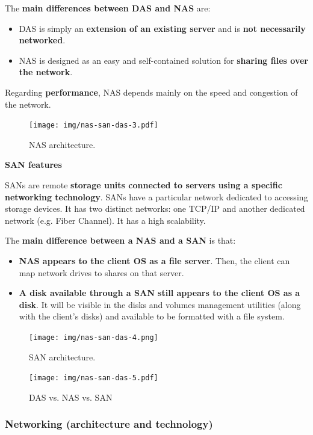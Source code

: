 \highspace
The \textbf{main differences between DAS and NAS} are:
\begin{itemize}
	\item DAS is simply an \textbf{extension of an existing server} and is \textbf{not necessarily networked}.
	\item NAS is designed as an easy and self-contained solution for \textbf{sharing files over the network}.
\end{itemize}
Regarding \textbf{performance}, NAS depends mainly on the speed and congestion of the network.
\begin{figure}[!htp]
	\centering
	\texttt{[image: img/nas-san-das-3.pdf]}
	\caption{NAS architecture.}
\end{figure}

\highspace
\begin{flushleft}
	\textcolor{Red2}{ \textbf{SAN features}}
\end{flushleft}
SANs are remote \textbf{storage units connected to servers using a specific networking technology}. SANs have a particular network dedicated to accessing storage devices. It has two distinct networks: one TCP/IP and another dedicated network (e.g. Fiber Channel). It has a high scalability.

\highspace
The \textbf{main difference between a NAS and a SAN} is that:
\begin{itemize}
	\item \textbf{NAS appears to the client OS as a file server}. Then, the client can map network drives to shares on that server.
	
	\item \textbf{A disk available through a SAN still appears to the client OS as a disk}. It will be visible in the disks and volumes management utilities (along with the client's disks) and available to be formatted with a file system.
\end{itemize}
\begin{figure}[!htp]
	\centering
	\texttt{[image: img/nas-san-das-4.png]}
	\caption{SAN architecture.}
\end{figure}

\begin{figure}[!htp]
	\centering
	\texttt{[image: img/nas-san-das-5.pdf]}
	\caption{DAS vs. NAS vs. SAN}
\end{figure}

\newpage

\subsubsection{Networking (architecture and technology)}\label{subsubsection: Networking (architecture and technology)}

